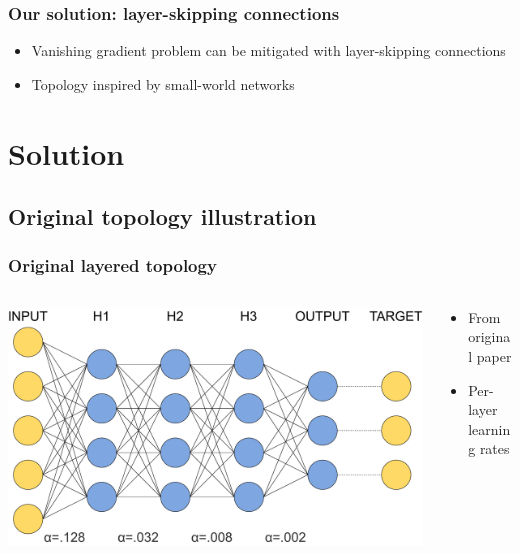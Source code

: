 \documentclass[pdf]{beamer}
\begin{document}
\begin{frame}
\frametitle{Our solution: layer-skipping connections}
\begin{itemize}
	\item<1-> Vanishing gradient problem can be mitigated with layer-skipping connections
	\item<2-> Topology inspired by small-world networks
\end{itemize}
\end{frame}

\section{Solution}

\subsection{Original topology illustration}
\begin{frame}
	\frametitle{Original layered topology}
	\begin{columns}
	\begin{column}{.6\textwidth}
		\begin{center}
		\includegraphics[width=\textwidth]{figures/basic_topology_illustration.pdf}
		\end{center}
	\end{column}
	\begin{column}{.4\textwidth}
		\begin{itemize}
			\item<1-> From original paper
			\item<2-> Per-layer learning rates
		\end{itemize}
	\end{column}
	\end{columns}
\end{frame}
\end{document}
